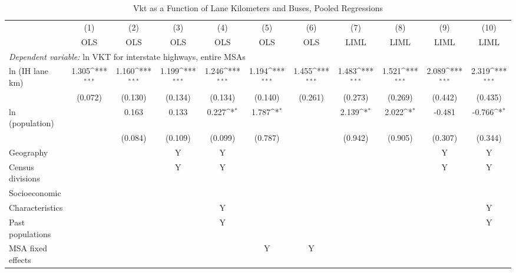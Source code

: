           \begin{table}[htbp]\centering         {}         \caption{Vkt as a Function of Lane Kilometers and Buses, Pooled Regressions}         \begin{tabular}{l*{10}{c}}         \hline\hline                 
                    &\multicolumn{1}{c}{(1)}&\multicolumn{1}{c}{(2)}&\multicolumn{1}{c}{(3)}&\multicolumn{1}{c}{(4)}&\multicolumn{1}{c}{(5)}&\multicolumn{1}{c}{(6)}&\multicolumn{1}{c}{(7)}&\multicolumn{1}{c}{(8)}&\multicolumn{1}{c}{(9)}&\multicolumn{1}{c}{(10)}\\
                    &\multicolumn{1}{c}{OLS}&\multicolumn{1}{c}{OLS}&\multicolumn{1}{c}{OLS}&\multicolumn{1}{c}{OLS}&\multicolumn{1}{c}{OLS}&\multicolumn{1}{c}{OLS}&\multicolumn{1}{c}{LIML}&\multicolumn{1}{c}{LIML}&\multicolumn{1}{c}{LIML}&\multicolumn{1}{c}{LIML}\\
 \hline \multicolumn{10}{l}{ \emph{Dependent variable:} ln VKT for interstate highways, entire MSAs} \\ 
ln (IH lane km)     &       1.305\sym{***}&       1.160\sym{***}&       1.199\sym{***}&       1.246\sym{***}&       1.194\sym{***}&       1.455\sym{***}&       1.483\sym{***}&       1.521\sym{***}&       2.089\sym{***}&       2.319\sym{***}\\
                    &     (0.072)         &     (0.130)         &     (0.134)         &     (0.134)         &     (0.140)         &     (0.261)         &     (0.273)         &     (0.269)         &     (0.442)         &     (0.435)         \\
[1em]
ln (population)     &                     &       0.163         &       0.133         &       0.227\sym{*}  &       1.787\sym{*}  &                     &       2.139\sym{*}  &       2.022\sym{*}  &      -0.481         &      -0.766\sym{*}  \\
                    &                     &     (0.084)         &     (0.109)         &     (0.099)         &     (0.787)         &                     &     (0.942)         &     (0.905)         &     (0.307)         &     (0.344)         \\
           Geography & & & Y & Y & & & & & Y & Y \\            Census divisions & & & Y & Y & & & & & Y & Y \\            Socioeconomic           \\Characteristics & & & & Y & & & & & & Y \\            Past populations & & & & Y & & & & & & Y \\           MSA fixed effects & & & & & Y & Y & & & & \\                 

\end{tabular}
\end{table}
